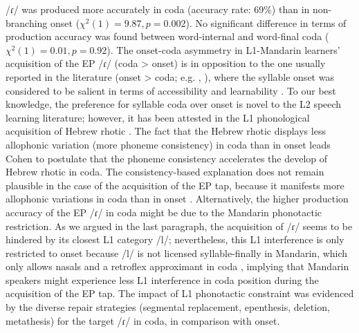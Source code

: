 \documentclass[output=paper]{../langscibook}
\begin{document}
/ɾ/ was produced more accurately in coda (accuracy rate: 69\%) than in non-branching onset ($\chi^2(1) = 9.87, p=0.002$). No significant difference in terms of production accuracy was found between word-internal and word-final coda ($\chi^2(1) = 0.01, p=0.92$). The onset-coda asymmetry in L1-Mandarin learners’ acquisition of the EP /ɾ/ (coda > onset) is in opposition to the one usually reported in the literature (onset > coda; e.g. \citealt{ColantoniSteele2008}, \citealt{Waltmunson2005}), where the syllable onset was considered to be salient in terms of accessibility and learnability \citep{Carlisle1998}. To our best knowledge, the preference for syllable coda over onset is novel to the L2 speech learning literature; however, it has been attested in the L1 phonological acquisition of Hebrew rhotic \citep{Cohen2015}. The fact that the Hebrew rhotic displays less allophonic variation (more phoneme consistency) in coda than in onset leads Cohen to postulate that the phoneme consistency accelerates the develop of Hebrew rhotic in coda. The consistency-based explanation does not remain plausible in the case of the acquisition of the EP tap, because it manifests more allophonic variations in coda than in onset \citep{Silva2014}. Alternatively, the higher production accuracy of the EP /ɾ/ in coda might be due to the Mandarin phonotactic restriction. As we argued in the last paragraph, the acquisition of /ɾ/ seems to be hindered by its closest L1 category /l/; nevertheless, this L1 interference is only restricted to onset because /l/ is not licensed syllable-finally in Mandarin, which only allows nasals and a retroflex approximant in coda \citep{Lin2007}, implying that Mandarin speakers might experience less L1 interference in coda position during the acquisition of the EP tap. The impact of L1 phonotactic constraint was evidenced by the diverse repair strategies (segmental replacement, epenthesis, deletion, metathesis) for the target /ɾ/ in coda, in comparison with onset.
\end{document}
